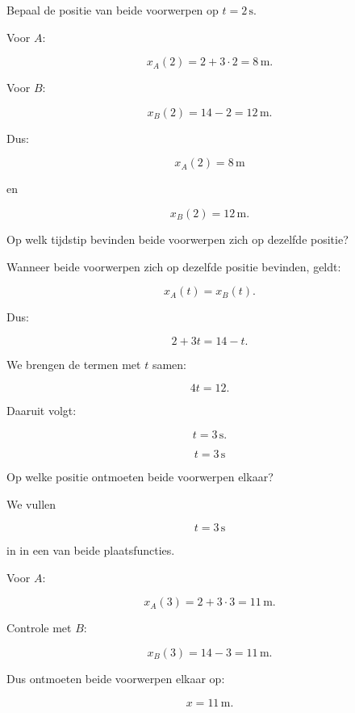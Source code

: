 \documentclass{ximera}
\begin{document}
\begin{oefening}{\oefU}
  
  \begin{question}
  Bepaal de positie van beide voorwerpen op $t=2\,\mathrm{s}$.
  
  \begin{oplossing}
  Voor $A$:
  
  \[
  x_A(2)
  =
  2+3\cdot2
  =
  8\,\mathrm{m}.
  \]
  
  Voor $B$:
  
  \[
  x_B(2)
  =
  14-2
  =
  12\,\mathrm{m}.
  \]
  
  Dus:
  
  \[
  \boxed{x_A(2)=8\,\mathrm{m}}
  \]
  
  en
  
  \[
  \boxed{x_B(2)=12\,\mathrm{m}}.
  \]
  \end{oplossing}
  \end{question}
  
  
  \begin{question}
  Op welk tijdstip bevinden beide voorwerpen zich op dezelfde positie?
  
  \begin{oplossing}
  Wanneer beide voorwerpen zich op dezelfde positie bevinden, geldt:
  
  \[
  x_A(t)=x_B(t).
  \]
  
  Dus:
  
  \[
  2+3t=14-t.
  \]
  
  We brengen de termen met $t$ samen:
  
  \[
  4t=12.
  \]
  
  Daaruit volgt:
  
  \[
  t=3\,\mathrm{s}.
  \]
  
  \[
  \boxed{t=3\,\mathrm{s}}
  \]
  \end{oplossing}
  \end{question}
  
  
  \begin{question}
  Op welke positie ontmoeten beide voorwerpen elkaar?
  
  \begin{oplossing}
  We vullen
  
  \[
  t=3\,\mathrm{s}
  \]
  
  in in een van beide plaatsfuncties.
  
  Voor $A$:
  
  \[
  x_A(3)
  =
  2+3\cdot3
  =
  11\,\mathrm{m}.
  \]
  
  Controle met $B$:
  
  \[
  x_B(3)
  =
  14-3
  =
  11\,\mathrm{m}.
  \]
  
  Dus ontmoeten beide voorwerpen elkaar op:
  
  \[
  \boxed{x=11\,\mathrm{m}}.
  \]
  \end{oplossing}
  \end{question}
  
  \end{oefening}
\end{document}
